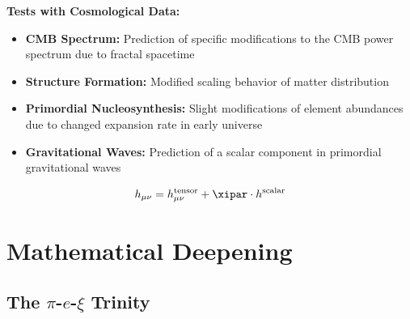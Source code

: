 	\begin{application}
		\textbf{Tests with Cosmological Data:}
		
		\begin{itemize}
			\item \textbf{CMB Spectrum:} Prediction of specific modifications to the CMB power spectrum due to fractal spacetime
			
			\item \textbf{Structure Formation:} Modified scaling behavior of matter distribution
			
			\item \textbf{Primordial Nucleosynthesis:} Slight modifications of element abundances due to changed expansion rate in early universe
			
			\item \textbf{Gravitational Waves:} Prediction of a scalar component in primordial gravitational waves
		\end{itemize}
		
		\begin{equation}
			h_{\mu\nu} = h_{\mu\nu}^{\text{tensor}} + \xipar \cdot h^{\text{scalar}}
		\end{equation}
	\end{application}
	
	\section{Mathematical Deepening}
	
	\subsection{The $\pi$-$e$-$\xi$ Trinity}
	
